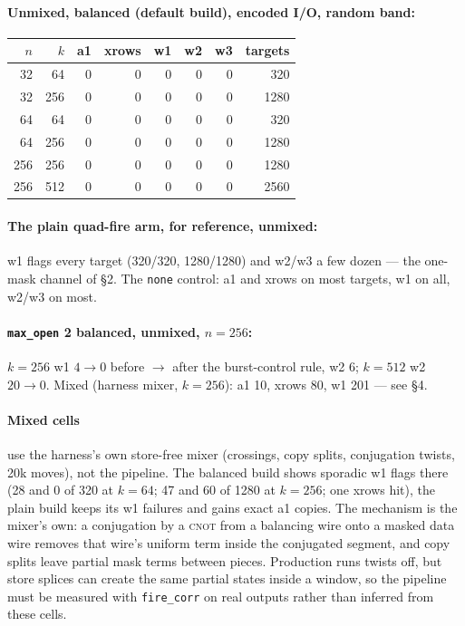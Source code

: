 \documentclass[11pt]{article}
\newcommand{\doc}[1]{\texttt{#1}}
\begin{document}
\paragraph{Unmixed, balanced (default build), encoded I/O, random band:}
\begin{center}\small
\begin{tabular}{@{}rrrrrrrr@{}}\toprule
$n$ & $k$ & a1 & xrows & w1 & w2 & w3 & targets\\\midrule
32 & 64 & 0 & 0 & 0 & 0 & 0 & 320\\
32 & 256 & 0 & 0 & 0 & 0 & 0 & 1280\\
64 & 64 & 0 & 0 & 0 & 0 & 0 & 320\\
64 & 256 & 0 & 0 & 0 & 0 & 0 & 1280\\
256 & 256 & 0 & 0 & 0 & 0 & 0 & 1280\\
256 & 512 & 0 & 0 & 0 & 0 & 0 & 2560\\\bottomrule
\end{tabular}
\end{center}

\paragraph{The plain quad-fire arm, for reference, unmixed:} w1 flags every target (320/320,
1280/1280) and w2/w3 a few dozen --- the one-mask channel of \S2. The \doc{none} control: a1
and xrows on most targets, w1 on all, w2/w3 on most.

\paragraph{\doc{max\_open} 2 balanced, unmixed, $n=256$:} $k=256$ w1 $4\to0$ before $\to$
after the burst-control rule, w2 6; $k=512$ w2 $20\to0$. Mixed (harness mixer, $k=256$):
a1 10, xrows 80, w1 201 --- see \S4.

\paragraph{Mixed cells} use the harness's own store-free mixer (crossings, copy splits,
conjugation twists, 20k moves), not the pipeline. The balanced build shows sporadic w1 flags
there (28 and 0 of 320 at $k=64$; 47 and 60 of 1280 at $k=256$; one xrows hit), the plain
build keeps its w1 failures and gains exact a1 copies. The mechanism is the mixer's own: a
conjugation by a \textsc{cnot} from a balancing wire onto a masked data wire removes that
wire's uniform term inside the conjugated segment, and copy splits leave partial mask terms
between pieces. Production runs twists off, but store splices can create the same partial
states inside a window, so the pipeline must be measured with \doc{fire\_corr} on real
outputs rather than inferred from these cells.
\end{document}
